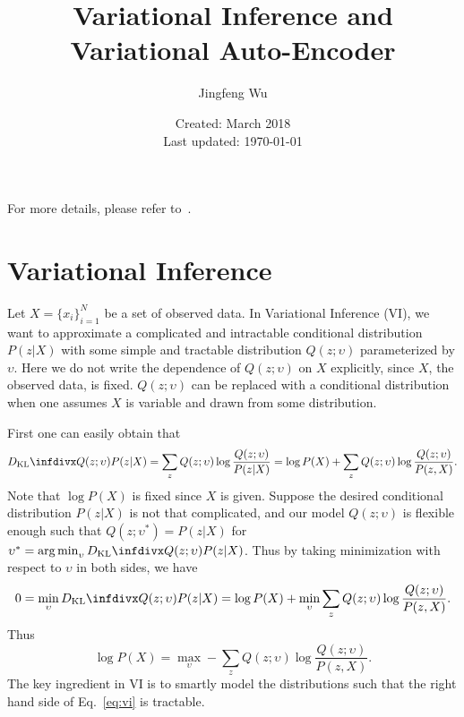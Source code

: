 \documentclass{article}
\title{Variational Inference and Variational Auto-Encoder}
\author{Jingfeng Wu}
\date{Created: March 2018\\ Last updated: \today}
\begin{document}
\maketitle
For more details, please refer to~\cite{blei2017variational,doersch2016tutorial,kingma2013autoencoding,kingma2019introduction}.

\section{Variational Inference}
Let $X = \{x_i\}_{i=1}^N$ be a set of observed data.
In Variational Inference (VI), we want to approximate a complicated and intractable conditional distribution $P(z|X)$ with some simple and tractable distribution $Q(z; \upsilon)$ parameterized by $\upsilon$.
Here we do not write the dependence of $Q(z;\upsilon)$ on $X$ explicitly, since $X$, the observed data, is fixed.
$Q(z;\upsilon)$ can be replaced with a conditional distribution when one assumes $X$ is variable and drawn from some distribution.

First one can easily obtain that
\begin{equation}
    \kld{Q(z;\upsilon)}{P(z|X)} = \sum_{z}Q(z;\upsilon) \log \frac{Q(z;\upsilon)}{P(z|X)} = \log P(X) + \sum_{z} Q(z;\upsilon) \log \frac{Q(z;\upsilon)}{P(z,X)}.
\end{equation}
Note that $\log P(X)$ is fixed since $X$ is given.
Suppose the desired conditional distribution $P(z|X)$ is not that complicated, and our model $Q(z;\upsilon)$ is flexible enough such that $Q(z;\upsilon^*) = P(z|X)$ for $\upsilon^* = \argmin_{\upsilon} \kld{Q(z;\upsilon)}{P(z|X)}$.
Thus by taking minimization with respect to $\upsilon$ in both sides, we have
\begin{equation}
    0 = \min_{\upsilon}\kld{Q(z;\upsilon)}{P(z|X)} = \log P(X) + \min_{\upsilon}\sum_{z} Q(z;\upsilon) \log \frac{Q(z;\upsilon)}{P(z,X)}.
\end{equation}
Thus
\begin{equation}\label{eq:vi}
    \log P(X) = \max_{\upsilon} - \sum_{z} Q(z;\upsilon) \log \frac{Q(z;\upsilon)}{P(z,X)}.
\end{equation}
The key ingredient in VI is to smartly model the distributions such that the right hand side of Eq.~\eqref{eq:vi} is tractable.
\end{document}

